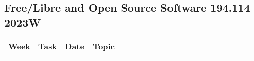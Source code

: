 \documentclass[a4paper]{article}
\def\mytitle{Free/Libre and Open Source Software 194.114 2023W}
\begin{document}
\begin{center}
  \section*{\mytitle}
\end{center}
\thispagestyle{fancy}

\begin{longtable}{@{}ll@{~~}rlr@{}}
\textbf{Week} & \textbf{Task} & \textbf{Date} & \textbf{Topic} \\
\\[-2.1ex]

\end{longtable}

\doclicenseThis
\end{document}

